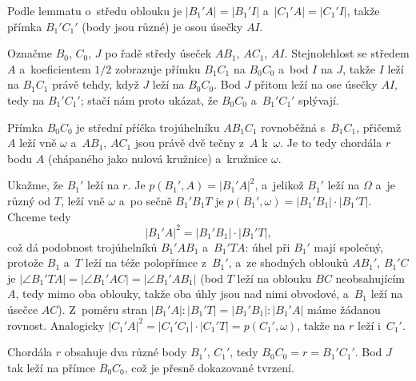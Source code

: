 {    Podle lemmatu o~středu oblouku je $|B_1'A| = |B_1'I|$ a~$|C_1'A| = |C_1'I|$, takže přímka $B_1'C_1'$ (body jsou různé) je osou úsečky $AI$.

    Označme $B_0$, $C_0$, $J$ po řadě středy úseček $AB_1$, $AC_1$, $AI$. Stejnolehlost se středem $A$ a~koeficientem $1/2$ zobrazuje přímku $B_1C_1$ na $B_0C_0$ a~bod $I$ na $J$, takže $I$ leží na $B_1C_1$ právě tehdy, když $J$ leží na $B_0C_0$. Bod $J$ přitom leží na ose úsečky $AI$, tedy na $B_1'C_1'$; stačí nám proto ukázat, že $B_0C_0$ a~$B_1'C_1'$ splývají.

    Přímka $B_0C_0$ je střední příčka trojúhelníku $AB_1C_1$ rovnoběžná s~$B_1C_1$, přičemž $A$ leží vně $\omega$ a~$AB_1$, $AC_1$ jsou právě dvě tečny z~$A$ k~$\omega$. Je to tedy chordála $r$ bodu $A$ (chápaného jako nulová kružnice) a~kružnice $\omega$.

    Ukažme, že $B_1'$ leží na $r$. Je $p(B_1',A) = |B_1'A|^2$, a~jelikož $B_1'$ leží na $\Omega$ a~je různý od $T$, leží vně $\omega$ a~po sečně $B_1'B_1T$ je $p(B_1',\omega) = |B_1'B_1| \cdot |B_1'T|$. Chceme tedy
    $$
    |B_1'A|^2 = |B_1'B_1| \cdot |B_1'T| ,
    $$
    což dá podobnost trojúhelníků $B_1'AB_1$ a~$B_1'TA$: úhel při $B_1'$ mají společný, protože $B_1$ a~$T$ leží na téže polopřímce z~$B_1'$, a~ze shodných oblouků $AB_1'$, $B_1'C$ je $|\angle B_1'TA| = |\angle B_1'AC| = |\angle B_1'AB_1|$ (bod $T$ leží na oblouku $BC$ neobsahujícím $A$, tedy mimo oba oblouky, takže oba úhly jsou nad nimi obvodové, a~$B_1$ leží na úsečce $AC$). Z~poměru stran $|B_1'A| : |B_1'T| = |B_1'B_1| : |B_1'A|$ máme žádanou rovnost. Analogicky $|C_1'A|^2 = |C_1'C_1| \cdot |C_1'T| = p(C_1',\omega)$, takže na $r$ leží i~$C_1'$.

    Chordála $r$ obsahuje dva různé body $B_1'$, $C_1'$, tedy $B_0C_0 = r = B_1'C_1'$. Bod $J$ tak leží na přímce $B_0C_0$, což je přesně dokazované tvrzení.
}

